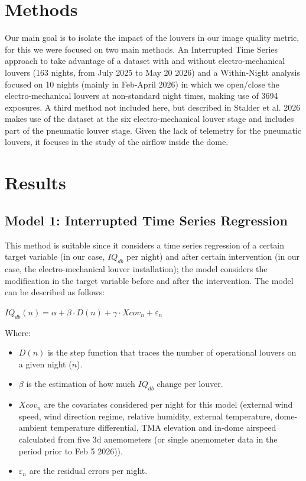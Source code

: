 \documentclass[TS,lsstdraft,authoryear,toc]{lsstdoc}
\begin{document}
\section{Methods}
Our main goal is to isolate the impact of the louvers in our image quality metric, for this we were focused on two main methods. An Interrupted Time Series approach to take advantage of a dataset with and without electro-mechanical louvers (163 nights, from July 2025 to May 20 2026) and a Within-Night analysis focused on 10 nights (mainly in Feb-April 2026) in which we open/close the electro-mechanical louvers at non-standard night times, making use of 3694 exposures. A third method not included here, but described in Stalder et al. 2026 makes use of the dataset at the six electro-mechanical louver stage and includes part of the pneumatic louver stage. Given the lack of  telemetry for the pneumatic louvers, it focuses in the study of the airflow inside the dome.


\section{Results}
\subsection{Model 1: Interrupted Time Series Regression}
This method is suitable since it considers a time series regression of a certain target variable (in our case, $IQ_{db}$ per night) and after certain intervention (in our case, the electro-mechanical louver installation); the model considers the modification in the target variable before and after the intervention. The model can be described as follows:

$IQ_{db}(n) = \alpha + \beta \cdot D(n) + \gamma \cdot {Xcov}_n  + {\varepsilon}_n$

Where:
\begin{itemize}
	\item $D(n)$ is the step function that traces the number of operational louvers on a given night ($n$).
	\item $\beta$ is the estimation of how much $IQ_{db}$ change per louver.
	\item ${Xcov}_n$ are the covariates considered per night for this model (external wind speed, wind direction regime, relative humidity, external temperature, dome-ambient temperature differential, TMA elevation and in-dome airspeed calculated from five 3d  anemometers  (or single anemometer data in the period prior to Feb 5 2026)).
	\item ${\varepsilon}_n$ are the residual errors per night.
\end{itemize}
\end{document}
